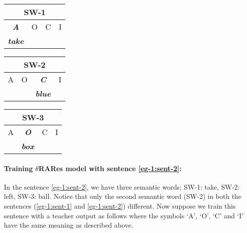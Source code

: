 \begin{table}[H]
\centering
\begin{minipage}{1.5in}
\begin{tabular}{|c|c|c|c|}
\hline
\multicolumn{4}{|c|}{\textbf{SW-1}}   \\ \hline
\textit{\textbf{A}}    & O & C & I     \\ \hline
\textit{\textbf{take}} &   &   &          \\  \hline
\end{tabular}
\end{minipage}
\begin{minipage}{1.5in}
\begin{tabular}{|c|c|c|c|}
\hline
\multicolumn{4}{|c|}{\textbf{SW-2}}                    \\ \hline
A    & O & \textit{\textbf{C}}    & I  \\ \hline
    &   & \textit{\textbf{blue}} &     \\ \hline
\end{tabular}
\end{minipage}
\begin{minipage}{1.5in}
\begin{tabular}{|c|c|c|c|}
\hline
\multicolumn{4}{|c|}{\textbf{SW-3}}                                  \\ \hline
A    & \textit{\textbf{O}}   & C    & I \\ \hline
     & \textit{\textbf{box}} &      &   \\ \hline
\end{tabular}
\end{minipage}
\end{table}

\paragraph{Training $\theta$RARes model with sentence \ref{eg-1:sent-2}:} In the sentence \ref{eg-1:sent-2}, we have three semantic words; SW-1: take, SW-2: left, SW-3: ball. Notice that only the second semantic word (SW-2) in both the sentences (\ref{eg-1:sent-1} and \ref{eg-1:sent-2}) different. Now suppose we train this sentence with a teacher output as follows where the symbols `A', `O', `C' and `I' have the same meaning as described above.


